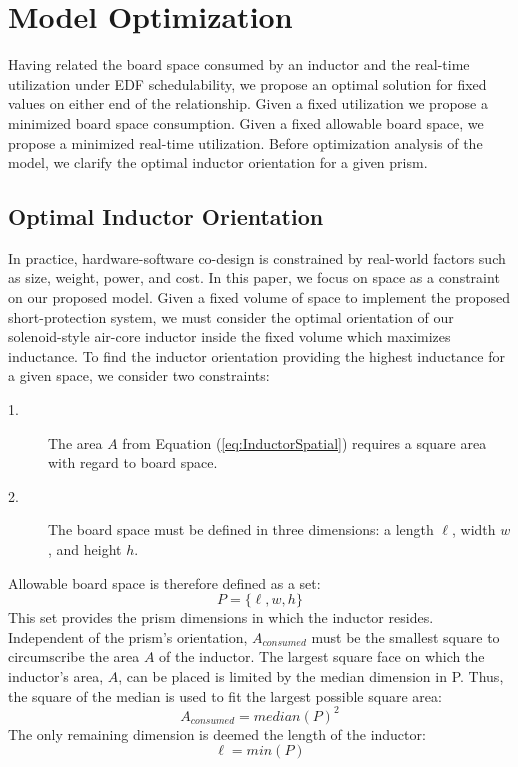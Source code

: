 \documentclass[11pt,oneside]{report}
\begin{document}
    \chapter{Model Optimization}\label{chap:model optimization}
    Having related the board space consumed by an inductor and the real-time utilization under EDF schedulability, we propose an optimal solution for fixed values on either end of the relationship. Given a fixed utilization we propose a minimized board space consumption. Given a fixed allowable board space, we propose a minimized real-time utilization. Before optimization analysis of the model, we clarify the optimal inductor orientation for a given prism.
    
    \section*{Optimal Inductor Orientation}
    In practice, hardware-software co-design is constrained by real-world factors such as size, weight, power, and cost. In this paper, we focus on space as a constraint on our proposed model.
    Given a fixed volume of space to implement the proposed short-protection system, we must consider the optimal orientation of our solenoid-style air-core inductor inside the fixed volume which maximizes inductance. 
    To find the inductor orientation providing the highest inductance for a given space, we consider two constraints:
    \begin{description}
    \item [1.] The area $A$ from Equation (\ref{eq:InductorSpatial}) requires a square area with regard to board space.
    \item [2.] The board space must be defined in three dimensions: a length $\ell$, width $w$, and height $h$.
    \end{description}
    Allowable board space is therefore defined as a set:
    \begin{equation}\label{eq:Prism}
    P = \{\ell,w,h\}
    \end{equation}
    This set provides the prism dimensions in which the inductor resides. Independent of the prism's orientation, $A_{consumed}$ must be the smallest square to circumscribe the area $A$ of the inductor. The largest square face on which the inductor's area, $A$, can be placed is limited by the median dimension in P. Thus, the square of the median is used to fit the largest possible square area:
    \begin{equation}\label{eq:PrismAreaConsumed}
    A_{consumed} = median(P)^2
    \end{equation}
    The only remaining dimension is deemed the length of the inductor:
    \begin{equation}\label{eq:PrismLength}
    \ell = min(P)
    \end{equation}
    
\end{document}
